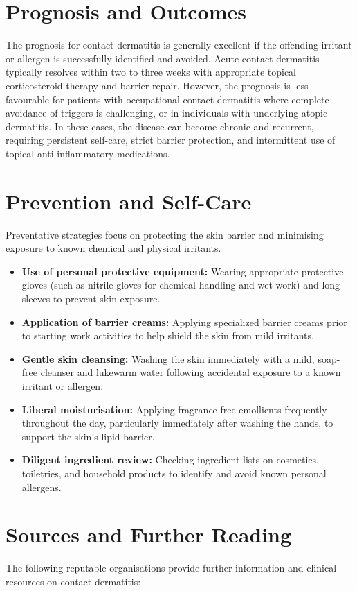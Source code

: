 \section*{Prognosis and Outcomes}
The prognosis for contact dermatitis is generally excellent if the offending irritant or allergen is successfully identified and avoided. Acute contact dermatitis typically resolves within two to three weeks with appropriate topical corticosteroid therapy and barrier repair. However, the prognosis is less favourable for patients with occupational contact dermatitis where complete avoidance of triggers is challenging, or in individuals with underlying atopic dermatitis. In these cases, the disease can become chronic and recurrent, requiring persistent self-care, strict barrier protection, and intermittent use of topical anti-inflammatory medications.

\section*{Prevention and Self-Care}
Preventative strategies focus on protecting the skin barrier and minimising exposure to known chemical and physical irritants.

\begin{itemize}
    \item \textbf{Use of personal protective equipment:} Wearing appropriate protective gloves (such as nitrile gloves for chemical handling and wet work) and long sleeves to prevent skin exposure.
    \item \textbf{Application of barrier creams:} Applying specialized barrier creams prior to starting work activities to help shield the skin from mild irritants.
    \item \textbf{Gentle skin cleansing:} Washing the skin immediately with a mild, soap-free cleanser and lukewarm water following accidental exposure to a known irritant or allergen.
    \item \textbf{Liberal moisturisation:} Applying fragrance-free emollients frequently throughout the day, particularly immediately after washing the hands, to support the skin's lipid barrier.
    \item \textbf{Diligent ingredient review:} Checking ingredient lists on cosmetics, toiletries, and household products to identify and avoid known personal allergens.
\end{itemize}

\section*{Sources and Further Reading}
The following reputable organisations provide further information and clinical resources on contact dermatitis:

